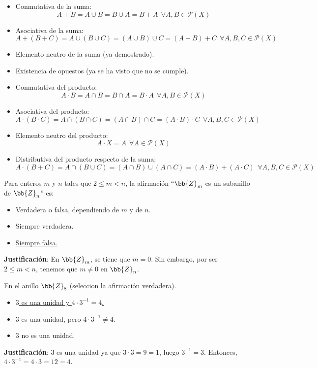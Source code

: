 \begin{ejercicio}
    \begin{itemize}
        \item Conmutativa de la suma:
        $$A + B = A \cup B = B \cup A = B + A~~\forall A,B \in \mathcal{P}(X)$$
        \item Asociativa de la suma:
        $$A + (B + C) = A \cup (B \cup C) = (A \cup B) \cup C = (A+B)+C~~\forall A,B,C \in \mathcal{P}(X)$$
        \item Elemento neutro de la suma (ya demostrado).
        \item Existencia de opuestos (ya se ha visto que no se cumple).
        \item Conmutativa del producto:
        $$A \cdot B = A \cap B = B \cap A = B \cdot A~~\forall A,B \in \mathcal{P}(X)$$
        \item Asociativa del producto:
        $$A \cdot (B \cdot C) = A \cap (B \cap C) = (A \cap B) \cap C = (A\cdot B)\cdot C~~\forall A,B,C \in \mathcal{P}(X)$$
        \item Elemento neutro del producto:
            $$A \cdot X = A~~\forall A \in \mathcal{P}(X)$$
        \item Distributiva del producto respecto de la suma:
            $$A \cdot (B + C) = A \cap (B \cup C) = (A \cap B) \cup (A \cap C) = (A \cdot B) +(A\cdot C)~~\forall A,B,C \in \mathcal{P}(X)$$
    \end{itemize}
\end{ejercicio}

\begin{ejercicio}
    Para enteros $m$ y $n$ tales que $2 \leq m < n$, la afirmación ``$\bb{Z}_m$ es un subanillo de $\bb{Z}_n$'' es:
    \begin{itemize}
        \item Verdadera o falsa, dependiendo de $m$ y de $n$.
        \item Siempre verdadera.
        \item \underline{Siempre falsa.}
    \end{itemize}

    \noindent
    \textbf{Justificación}:
    En $\bb{Z}_m$, se tiene que $m = 0$.\newline
    Sin embargo, por ser $2 \leq m < n$, tenemos que $m \neq 0$ en $\bb{Z}_n$.
\end{ejercicio}

\begin{ejercicio}
    En el anillo $\bb{Z}_8$ (seleccion la afirmación verdadera).
    \begin{itemize}
        \item \underline{$3$ es una unidad y $4 \cdot 3^{-1} = 4$.}
        \item $3$ es una unidad, pero $4 \cdot 3^{-1} \neq 4$.
        \item $3$ no es una unidad.
    \end{itemize}

    \noindent
    \textbf{Justificación}:
    $3$ es una unidad ya que $3 \cdot 3 = 9 = 1$, luego $3^{-1} = 3$.\newline
    Entonces, $4 \cdot 3^{-1} = 4 \cdot 3 = 12 = 4$.
\end{ejercicio}

